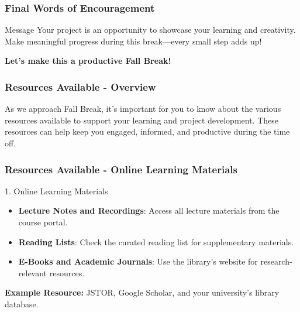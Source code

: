 \documentclass[aspectratio=169]{beamer}
\begin{document}
\begin{frame}[fragile]
    \frametitle{Final Words of Encouragement}
    \begin{block}{Message}
        Your project is an opportunity to showcase your learning and creativity. 
        Make meaningful progress during this break—every small step adds up!
    \end{block}
    \begin{center}
        \textbf{Let's make this a productive Fall Break!}
    \end{center}
\end{frame}

\begin{frame}[fragile]
    \frametitle{Resources Available - Overview}
    As we approach Fall Break, it's important for you to know about the various resources available to support your learning and project development. 
    These resources can help keep you engaged, informed, and productive during the time off.
\end{frame}

\begin{frame}[fragile]
    \frametitle{Resources Available - Online Learning Materials}
    \begin{block}{1. Online Learning Materials}
        \begin{itemize}
            \item \textbf{Lecture Notes and Recordings}: Access all lecture materials from the course portal.
            \item \textbf{Reading Lists}: Check the curated reading list for supplementary materials.
            \item \textbf{E-Books and Academic Journals}: Use the library's website for research-relevant resources.
        \end{itemize}
        \textbf{Example Resource:} JSTOR, Google Scholar, and your university's library database.
    \end{block}
\end{frame}
\end{document}
